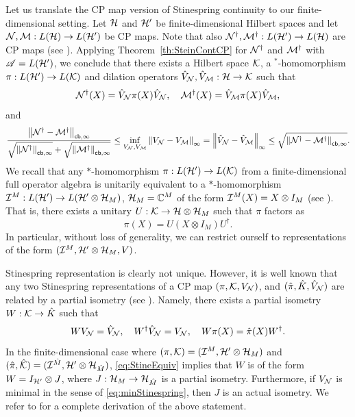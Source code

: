 \documentclass[10pt]{article}
\newcommand{\C}{\mathbb{C}}
\newcommand{\norm}[1]{\left\|#1\right\|}
\newcommand{\s}[1]{\mathsf{#1}}
\begin{document}
 Let us translate the CP map version of Stinespring continuity to our finite-dimensional setting. Let ${\cal H}$ and ${\cal H}'$ be finite-dimensional Hilbert spaces and let ${\cal N},{\cal M}:L({\cal H})\to L({\cal H}')$ be CP maps. Note that also ${\cal N}^\dag,{\cal M}^\dag: L({\cal H}')\to L({\cal H})$ are CP maps (see \cite[Proposition 2.18]{watrous2018theory}).  Applying Theorem~\ref{th:SteinContCP} for ${\cal N}^\dag$ and ${\cal M}^\dag$ with $\mathscr{A}=L({\cal H}')$, we conclude that there exists a Hilbert space ${\cal K}$, a $^*$-homomorphism $\pi:L({\cal H}')\to L({\cal K})$ and dilation operators $\hat{V}_{{\cal N}},\hat{V}_{{\cal M}}:{\cal H}\to {\cal K}$ such that
 \[{\cal N}^{\dag}(X)=\hat{V}_{{\cal N}}\pi(X)\hat{V}_{{\cal N}}, \quad  {\cal M}^\dag(X) = \hat{V}_{{\cal M}} \pi(X)\hat{V}_{{\cal M}},\]
 and
 \begin{equation}
     \frac{\norm{\calN^\dag -\calM^\dag}_{\s{cb},\infty}}{\sqrt{\norm{\calN^\dag}_{\s{cb},\infty}}+\sqrt{\norm{\calM^\dag}_{\s{cb},\infty}}} \leq \inf_{V_{\calN},V_{\calM}}\norm{V_{\calN}-V_{\calM}}_\infty=\norm{\hat{V}_{\calN}-\hat{V}_{\calM}}_\infty\leq \sqrt{\norm{\calN^\dag -\calM^\dag}_{\s{cb},\infty}}.\label{eq:ContinuityCP}
 \end{equation}
 We recall that any $*$-homomorphism $\pi: L({\cal H}')\to L({\cal K})$ from a finite-dimensional full operator algebra is unitarily equivalent to a $*$-homomorphism ${\cal I}^M :L({\cal H}')\to L({\cal H}'\otimes {\cal H}_M)$, $\calH_M=\C^M$ of  the form ${\cal I}^M(X)=X\otimes I_M$ (see \cite[Corollary III.1.2]{Davidson1996CStar}). That is, there exists a unitary $U:{\cal K}\to {\cal H}\otimes {\cal H}_M$ such that $\pi$ factors as
 \[\pi(X)=U(X\otimes I_M)U^\dag.\]
 In particular, without loss of generality, we can restrict ourself to representations of the form $({\cal I}^M,{\cal H}'\otimes {\cal H}_M,V)$.

 Stinespring representation is clearly not unique. However, it is well known that any two Stinespring representations of a CP map  $(\pi,{\cal K},V_{{\cal N}})$, and $(\hat{\pi},\hat{K},\hat{V}_{{\cal N}})$ are related by a partial isometry (see \cite[Eq. (2)]{Kretschmann2008Continuity}). Namely, there exists a partial isometry $W:{\cal K}\to\hat{K}$ such that 
 \begin{equation}
     WV_{{\cal N}}=\hat{V}_{{\cal N}}, \quad W^\dag \hat{V}_{{\cal N}}=V_{{\cal N}}, \quad  W\pi(X)=\hat{\pi}(X)W^\dag.\label{eq:StineEquiv}
 \end{equation}
 In the finite-dimensional case where $(\pi,{\cal K})=({\cal I}^M,{\cal H}'\otimes {\cal H}_M)$ and $(\hat{\pi},\hat{{\cal K}})=({\cal I}^{\hat{M}},{\cal H}'\otimes {\cal H}_{\hat{M}})$, \eqref{eq:StineEquiv} implies that $W$ is of the form $W=I_{{\cal H}'}\otimes J$, where $J:{\cal H}_M\to {\cal H}_{\hat{M}} $  is a partial isometry. Furthermore, if $V_{{\cal N}}$ is minimal in the sense of \eqref{eq:minStinespring}, then $J$ is an actual isometry. We refer to \cite[Section~III.B]{Kretschmann2008Information} for a complete derivation of the above statement. 
\end{document}
